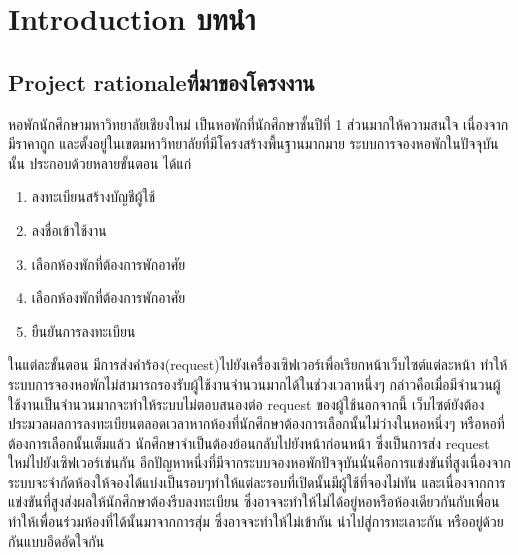 \chapter{\ifenglish Introduction \else บทนำ\fi}
\section{\ifenglish Project rationale\else ที่มาของโครงงาน\fi}

หอพักนักศึกษามหาวิทยาลัยเชียงใหม่ เป็นหอพักที่นักศึกษาชั้นปีที่ 1 ส่วนมากให้ความสนใจ เนื่องจากมีราคาถูก และตั้งอยู่ในเขตมหาวิทยาลัยที่มีโครงสร้างพื้นฐานมากมาย
ระบบการจองหอพักในปัจจุบันนั้น ประกอบด้วยหลายขั้นตอน ได้แก่
\begin{enumerate}
    \item ลงทะเบียนสร้างบัญชีผู้ใช้
    \item ลงชื่อเข้าใช้งาน
    \item เลือกห้องพักที่ต้องการพักอาศัย
    \item เลือกห้องพักที่ต้องการพักอาศัย
    \item ยืนยันการลงทะเบียน
\end{enumerate}
ในแต่ละขั้นตอน มีการส่งคำร้อง(request)ไปยังเครื่องเซิฟเวอร์เพื่อเรียกหน้าเว็บไซต์แต่ละหน้า 
ทำให้ระบบการจองหอพักไม่สามารถรองรับผู้ใช้งานจำนวนมากได้ในช่วงเวลาหนึ่งๆ กล่าวคือเมื่อมีจำนวนผู้ใช้งานเป็นจำนวนมากจะทำให้ระบบไม่ตอบสนองต่อ 
request ของผู้ใช้นอกจากนี้ เว็บไซต์ยังต้องประมวลผลการลงทะเบียนตลอดเวลาหากห้องที่นักศึกษาต้องการเลือกนั้นไม่ว่างในหอหนึ่งๆ หรือหอที่ต้องการเลือกนั้นเต็มแล้ว 
นักศึกษาจำเป็นต้องย้อนกลับไปยังหน้าก่อนหน้า ซึ่งเป็นการส่ง request ใหม่ไปยังเซิฟเวอร์เช่นกัน 
อีกปัญหาหนึ่งที่มีจากระบบจองหอพักปัจจุบันนั่นคือการแข่งขันที่สูงเนื่องจากระบบจะจำกัดห้องให้จองได้แบ่งเป็นรอบๆทำให้แต่ละรอบที่เปิดนั้นมีผู้ใช้ที่จองไม่ทัน
และเนื่องจากการแข่งขันที่สูงส่งผลให้นักศึกษาต้องรีบลงทะเบียน ซึ่งอาจจะทำให้ไม่ได้อยู่หอหรือห้องเดียวกันกับเพื่อน ทำให้เพื่อนร่วมห้องที่ได้นั้นมาจากการสุ่ม ซึ่งอาจจะทำให้ไม่เข้ากัน
นำไปสู่การทะเลาะกัน หรืออยู่ด้วยกันแบบอึดอัดใจกัน

